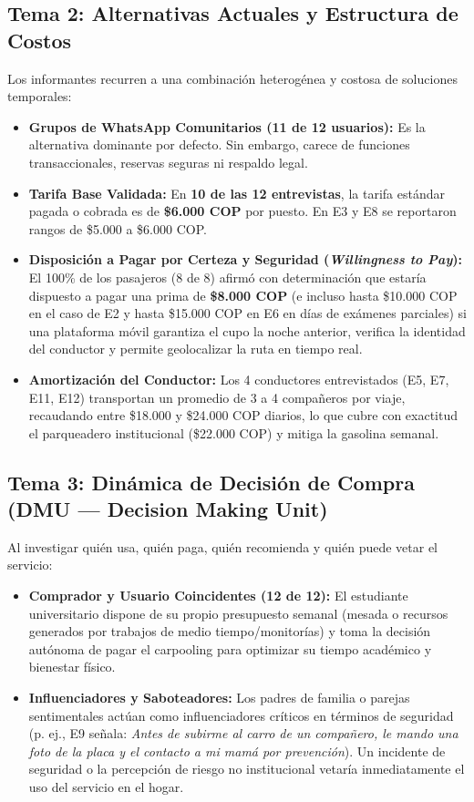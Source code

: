 \documentclass[11pt,a4paper]{article}
\begin{document}
\subsection{Tema 2: Alternativas Actuales y Estructura de Costos}
Los informantes recurren a una combinaci\'on heterog\'enea y costosa de soluciones temporales:
\begin{itemize}[leftmargin=*]
    \item \textbf{Grupos de WhatsApp Comunitarios (11 de 12 usuarios):} Es la alternativa dominante por defecto. Sin embargo, carece de funciones transaccionales, reservas seguras ni respaldo legal.
    \item \textbf{Tarifa Base Validada:} En \textbf{10 de las 12 entrevistas}, la tarifa est\'andar pagada o cobrada es de \textbf{\$6.000 COP} por puesto. En E3 y E8 se reportaron rangos de \$5.000 a \$6.000 COP.
    \item \textbf{Disposici\'on a Pagar por Certeza y Seguridad (\textit{Willingness to Pay}):} El 100\% de los pasajeros (8 de 8) afirm\'o con determinaci\'on que estar\'ia dispuesto a pagar una prima de \textbf{\$8.000 COP} (e incluso hasta \$10.000 COP en el caso de E2 y hasta \$15.000 COP en E6 en d\'ias de ex\'amenes parciales) si una plataforma m\'ovil garantiza el cupo la noche anterior, verifica la identidad del conductor y permite geolocalizar la ruta en tiempo real.
    \item \textbf{Amortizaci\'on del Conductor:} Los 4 conductores entrevistados (E5, E7, E11, E12) transportan un promedio de 3 a 4 compa\~neros por viaje, recaudando entre \$18.000 y \$24.000 COP diarios, lo que cubre con exactitud el parqueadero institucional (\$22.000 COP) y mitiga la gasolina semanal.
\end{itemize}

\subsection{Tema 3: Din\'amica de Decisi\'on de Compra (DMU --- Decision Making Unit)}
Al investigar qui\'en usa, qui\'en paga, qui\'en recomienda y qui\'en puede vetar el servicio:
\begin{itemize}[leftmargin=*]
    \item \textbf{Comprador y Usuario Coincidentes (12 de 12):} El estudiante universitario dispone de su propio presupuesto semanal (mesada o recursos generados por trabajos de medio tiempo/monitor\'ias) y toma la decisi\'on aut\'onoma de pagar el carpooling para optimizar su tiempo acad\'emico y bienestar f\'isico.
    \item \textbf{Influenciadores y Saboteadores:} Los padres de familia o parejas sentimentales act\'uan como influenciadores cr\'iticos en t\'erminos de seguridad (p. ej., E9 se\~nala: \textit{\guillemotleft Antes de subirme al carro de un compa\~nero, le mando una foto de la placa y el contacto a mi mam\'a por prevenci\'on\guillemotright}). Un incidente de seguridad o la percepci\'on de riesgo no institucional vetar\'ia inmediatamente el uso del servicio en el hogar.
\end{itemize}
\end{document}
